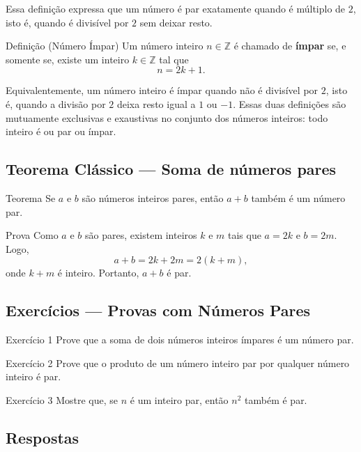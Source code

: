\documentclass[12pt,a4paper,openright]{book}
\begin{document}
Essa definição expressa que um número é par exatamente quando é múltiplo de \(2\), isto é, quando é divisível por \(2\) sem deixar resto.

\begin{block}{Definição (Número Ímpar)}
Um número inteiro \(n \in \mathbb{Z}\) é chamado de \textbf{ímpar} se, e somente se, existe um inteiro \(k \in \mathbb{Z}\) tal que
\[
n = 2k + 1.
\]
\end{block}

Equivalente­mente, um número inteiro é ímpar quando não é divisível por \(2\), isto é, quando a divisão por \(2\) deixa resto igual a \(1\) ou \(-1\). Essas duas definições são mutuamente exclusivas e exaustivas no conjunto dos números inteiros: todo inteiro é ou par ou ímpar.
\subsection{Teorema Clássico — Soma de números pares}

\begin{block}{Teorema}
Se \(a\) e \(b\) são números inteiros pares, então \(a + b\) também é um número par.
\end{block}

\begin{block}{Prova}
Como \(a\) e \(b\) são pares, existem inteiros \(k\) e \(m\) tais que \(a = 2k\) e \(b = 2m\). Logo,
\[
a + b = 2k + 2m = 2(k+m),
\]
onde \(k+m\) é inteiro. Portanto, \(a + b\) é par.
\end{block}
\subsection{Exercícios — Provas com Números Pares}

\begin{block}{Exercício 1}
Prove que a soma de dois números inteiros ímpares é um número par.
\end{block}

\begin{block}{Exercício 2}
Prove que o produto de um número inteiro par por qualquer número inteiro é par.
\end{block}

\begin{block}{Exercício 3}
Mostre que, se \(n\) é um inteiro par, então \(n^2\) também é par.
\end{block}

\subsection{Respostas}
\end{document}
